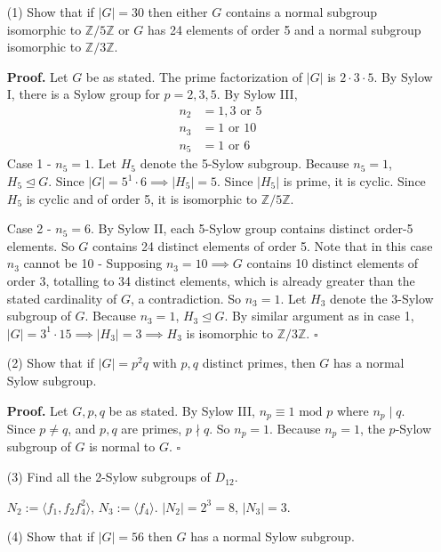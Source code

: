 \documentclass[11pt]{article}
\newcommand {\Z}{\mathbb{Z}}
\begin{document}
\begin{enumerate}
    \item [(1)] Show that if $|G| = 30$ then either $G$ contains a normal subgroup isomorphic to $\Z/5\Z$ or $G$ has 24 elements of order 5 and a normal subgroup isomorphic to $\Z/3\Z$.

    \textbf{Proof.} Let $G$ be as stated. The prime factorization of $|G|$ is $2 \cdot 3 \cdot 5$. By Sylow I, there is a Sylow group for $p = 2, 3, 5$. By Sylow III, 
    \begin{align*}
        n_2 &= 1, 3 \text{ or } 5\\
        n_3 &= 1 \text{ or } 10\\
        n_5 &= 1 \text{ or } 6
    \end{align*}
    Case 1 - $n_5 = 1$. Let $H_5$ denote the 5-Sylow subgroup. Because $n_5 = 1$, $H_5 \trianglelefteq G$. Since $|G| = 5^1 \cdot 6 \implies |H_5| = 5$. Since $|H_5|$ is prime, it is cyclic. Since $H_5$ is cyclic and of order 5, it is isomorphic to $\Z/5\Z$.
    
    Case 2 - $n_5 = 6$. By Sylow II, each 5-Sylow group contains distinct order-5 elements. So $G$ contains 24 distinct elements of order 5. Note that in this case $n_3$ cannot be 10 - Supposing $n_3 = 10 \implies G$ contains 10 distinct elements of order 3, totalling to 34 distinct elements, which is already greater than the stated cardinality of $G$, a contradiction. So $n_3 = 1$. Let $H_3$ denote the 3-Sylow subgroup of $G$. Because $n_3 = 1$, $H_3 \trianglelefteq G$. By similar argument as in case 1, $|G| = 3^1 \cdot 15 \implies |H_3| = 3 \implies H_3$ is isomorphic to $\Z/3\Z$. $\square$
    
    \item [(2)] Show that if $|G| = p^2q$ with $p, q$ distinct primes, then $G$ has a normal Sylow subgroup.

    \textbf{Proof.} Let $G, p, q$ be as stated. By Sylow III,
    $n_p \equiv 1 \text{ mod } p$ where $n_p \mid q$. Since $p \neq q$, and $p, q$ are primes, $p \nmid q$. So $n_p = 1$. Because $n_p = 1$, the $p$-Sylow subgroup of $G$ is normal to $G$. $\square$

    \item [(3)] Find all the 2-Sylow subgroups of $D_{12}$. 

    $N_2 := \langle f_1, f_2f_4^2 \rangle$, $N_3 := \langle f_4 \rangle$. $|N_2| = 2^3 = 8$, $|N_3| = 3$.

    \item [(4)] Show that if $|G| = 56$ then $G$ has a normal Sylow subgroup.


\end{enumerate}
\end{document}
